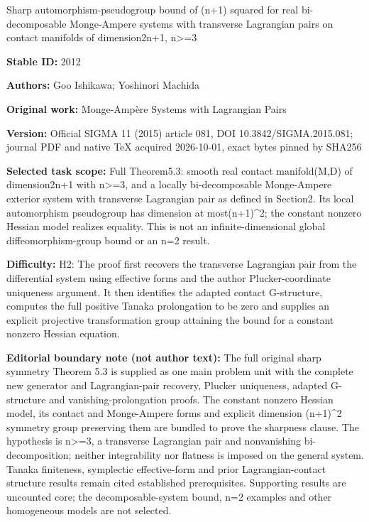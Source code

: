 \documentclass[11pt]{article}
\begin{document}
\begin{center}\Large Sharp automorphism-pseudogroup bound of (n+\allowbreak{}1) squared for real bi-decomposable Monge-Ampere systems with transverse Lagrangian pairs on contact manifolds of dimension2n+\allowbreak{}1, n>=\allowbreak{}3\end{center}
\noindent\textbf{Stable ID:} 2012\par
\noindent\textbf{Authors:} Goo Ishikawa; Yoshinori Machida\par
\noindent\textbf{Original work:} Monge-Ampère Systems with Lagrangian Pairs\par
\noindent\textbf{Version:} Official SIGMA 11 (2015) article 081, DOI 10.3842/SIGMA.2015.081; journal PDF and native TeX acquired 2026-10-01, exact bytes pinned by SHA256\par
\noindent\textbf{Selected task scope:} Full Theorem5.3: smooth real contact manifold(M,D) of dimension2n+\allowbreak{}1 with n>=\allowbreak{}3, and a locally bi-decomposable Monge-Ampere exterior system with transverse Lagrangian pair as defined in Section2. Its local automorphism pseudogroup has dimension at most(n+\allowbreak{}1)\textasciicircum{}2; the constant nonzero Hessian model realizes equality. This is not an infinite-dimensional global diffeomorphism-group bound or an n=\allowbreak{}2 result.\par
\noindent\textbf{Difficulty:} H2: The proof first recovers the transverse Lagrangian pair from the differential system using effective forms and the author Plucker-coordinate uniqueness argument. It then identifies the adapted contact G-structure, computes the full positive Tanaka prolongation to be zero and supplies an explicit projective transformation group attaining the bound for a constant nonzero Hessian equation.\par
\noindent\textbf{Editorial boundary note (not author text):} The full original sharp symmetry Theorem 5.3 is supplied as one main problem unit with the complete new generator and Lagrangian-pair recovery, Plucker uniqueness, adapted G-structure and vanishing-prolongation proofs. The constant nonzero Hessian model, its contact and Monge-Ampere forms and explicit dimension (n+\allowbreak{}1)\textasciicircum{}2 symmetry group preserving them are bundled to prove the sharpness clause. The hypothesis is n>=\allowbreak{}3, a transverse Lagrangian pair and nonvanishing bi-decomposition; neither integrability nor flatness is imposed on the general system. Tanaka finiteness, symplectic effective-form and prior Lagrangian-contact structure results remain cited established prerequisites. Supporting results are uncounted core; the decomposable-system bound, n=\allowbreak{}2 examples and other homogeneous models are not selected.\par
\end{document}
